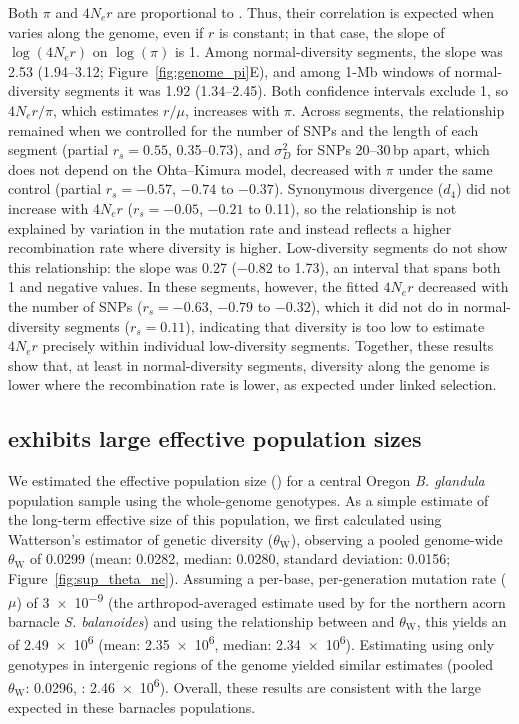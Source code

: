 Both $\pi$ and $4N_{e}r$ are proportional to \Ne{}.
Thus, their correlation is expected when \Ne{} varies along the genome, even if $r$
is constant; in that case, the slope of $\log(4N_{e}r)$ on $\log(\pi)$ is 1.
Among normal-diversity segments, the slope was 2.53 (1.94--3.12;
Figure~\ref{fig:genome_pi}E), and among 1-Mb windows of normal-diversity segments it
was 1.92 (1.34--2.45). Both confidence intervals exclude 1, so $4N_{e}r/\pi$, which
estimates $r/\mu$, increases with $\pi$.
Across segments, the relationship remained when we controlled for the number of SNPs
and the length of each segment (partial $r_s = 0.55$, 0.35--0.73), and $\sigma_{D}^{2}$
for SNPs 20--30\,bp apart, which does not depend on the Ohta--Kimura model, decreased
with $\pi$ under the same control (partial $r_s = -0.57$, $-0.74$ to $-0.37$).
Synonymous divergence ($d_{4}$) did not increase with $4N_{e}r$ ($r_s = -0.05$,
$-0.21$ to 0.11), so the relationship is not explained by variation in the mutation
rate and instead reflects a higher recombination rate where diversity is higher.
Low-diversity segments do not show this relationship: the slope was 0.27
($-0.82$ to 1.73), an interval that spans both 1 and negative values.
In these segments, however, the fitted $4N_{e}r$ decreased with the number of SNPs
($r_s = -0.63$, $-0.79$ to $-0.32$), which it did not do in normal-diversity segments
($r_s = 0.11$), indicating that diversity is too low to estimate $4N_{e}r$ precisely
within individual low-diversity segments.
Together, these results show that, at least in normal-diversity segments, diversity
along the \bgla{} genome is lower where the recombination rate is lower, as expected
under linked selection.

\subsection*{\balgla{} exhibits large effective population sizes}

We estimated the effective population size (\Ne{}) for a central
Oregon \textit{B. glandula} population sample using the whole-genome genotypes.
As a simple estimate of the long-term effective size of this population, we first
calculated \Ne{} using Watterson's estimator of genetic diversity ($\theta_\text{W}$),
observing a pooled genome-wide $\theta_\text{W}$ of 0.0299 (mean: 0.0282, median:
0.0280, standard deviation: 0.0156; Figure~\ref{fig:sup_theta_ne}).
Assuming a per-base, per-generation mutation rate ($\mu$) of \num{3e-9} (the
arthropod-averaged estimate used by \cite{nunez_footprints_2020} for the northern 
acorn barnacle \textit{S. balanoides})  and using the
relationship between \Ne{} and $\theta_\text{W}$, this yields an \Ne{} of 
\num{2.49e6} (mean: \num{2.35e6}, median: \num{2.34e6}).
Estimating using only genotypes in intergenic regions of the genome yielded
similar estimates (pooled $\theta_\text{W}$: 0.0296, \Ne{}: \num{2.46e6}).
Overall, these results are consistent with the large \Ne{} expected in these
barnacles populations.
\vspace{0.1cm}

